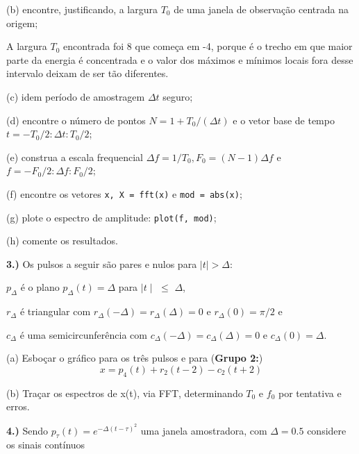 \documentclass[10pt]{article}
\begin{document}
(b) encontre, justificando, a largura $T_0$ de uma janela de observação centrada na origem;

\vspace{\baselineskip}

A largura $T_0$ encontrada foi 8 que começa em -4, porque é o trecho em que maior parte da energia é concentrada e o valor dos máximos e mínimos locais fora desse intervalo deixam de ser tão diferentes.

\vspace{\baselineskip}

(c) idem período de amostragem $\Delta t$ seguro;

(d) encontre o número de pontos $N = 1 + T_0 / (\Delta t)$ e o vetor base de tempo $t = -T_0 / 2 : \Delta t : T_0 / 2$;

(e) construa a escala frequencial $\Delta f = 1 / T_0, F_0 = (N - 1)\Delta f$ e $f = -F_0 / 2 : \Delta f : F_0 / 2$;

(f) encontre os vetores \texttt{x, X = fft(x)} e \texttt{mod = abs(x)};

(g) plote o espectro de amplitude: \texttt{plot(f, mod)};

(h) comente os resultados.


\vspace{\baselineskip}


\textbf{3.)} Os pulsos a seguir são pares e nulos para $\mid t \mid > \Delta$:

$p_{\Delta}$ é o plano $p_{\Delta}(t) = \Delta$ para $\mid t \mid\,\,\leq\,\, \Delta$,

$r_{\Delta}$ é triangular com $r_{\Delta}(-\Delta) = r_{\Delta}(\Delta) = 0$ e $r_{\Delta}(0) = \pi / 2$ e

$c_{\Delta}$ é uma semicircunferência com $c_{\Delta}(-\Delta) = c_{\Delta}(\Delta) = 0$ e $c_{\Delta}(0) = \Delta$.

(a) Esboçar o gráfico para os três pulsos e para (\textbf{Grupo 2:})
\[x = p_4(t) + r_2(t - 2) - c_2(t + 2)\]

(b) Traçar os espectros de x(t), via FFT, determinando $T_0$ e $f_0$ por tentativa e erros.


\vspace{\baselineskip}


\textbf{4.)} Sendo $p_{\tau}(t) = e^{-\Delta (t - \tau)^2}$ uma janela amostradora, com $\Delta = 0.5$ considere os sinais contínuos
\end{document}
